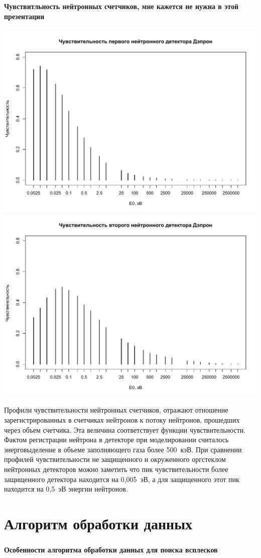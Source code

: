 \documentclass[t, aspectratio=43]{beamer}
\begin{document}
\begin{frame}	
\frametitle{\insertsection} 
\framesubtitle{Чувствитльность нейтронных счетчиков, мне кажется не нужна в этой презентации}

	\includegraphics[width=0.5\linewidth]{images/nsens3}
	\includegraphics[width=0.5\linewidth]{images/nsens4}


\tiny{Профили чувствительности нейтронных счетчиков, отражают отношение зарегистрированных в счетчиках нейтронов к потоку нейтронов, прошедших через объем счетчика. Эта величина соответствует функции чувствительности. Фактом регистрации нейтрона в детекторе при моделировании считалось энерговыделение в объеме заполняющего газа более 500~кэВ. При сравнении профилей чувствительности не защищенного и окруженного оргстеклом нейтронных детекторов можно заметить что пик чувствительности более защищенного детектора находится на 0,005~эВ, а для защищенного этот пик находится на 0,5~эВ энергии нейтронов.}

\end{frame}
\section{Алгоритм обработки данных}

\begin{frame}	
	\frametitle{\insertsection} 
	\framesubtitle{Особенности алгоритма обработки данных для поиска всплесков}
	
\end{frame}
\end{document}
